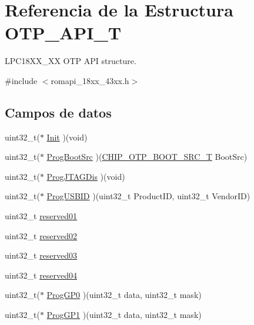 \hypertarget{struct_o_t_p___a_p_i___t}{}\section{Referencia de la Estructura O\+T\+P\+\_\+\+A\+P\+I\+\_\+T}
\label{struct_o_t_p___a_p_i___t}


L\+P\+C18\+X\+X\+\_\+XX O\+TP A\+PI structure.  




{\ttfamily \#include $<$romapi\+\_\+18xx\+\_\+43xx.\+h$>$}

\subsection*{Campos de datos}
\begin{DoxyCompactItemize}
\item 
uint32\+\_\+t($\ast$ \hyperlink{struct_o_t_p___a_p_i___t_a8a4babfa1f2262f27ab56052d32844a9}{Init} )(void)
\item 
uint32\+\_\+t($\ast$ \hyperlink{struct_o_t_p___a_p_i___t_a5d8400d1ec09241959b5e048826c4ae8}{Prog\+Boot\+Src} )(\hyperlink{group___o_t_p__18_x_x__43_x_x_gada36d39d34c8821f0416a852faa926f6}{C\+H\+I\+P\+\_\+\+O\+T\+P\+\_\+\+B\+O\+O\+T\+\_\+\+S\+R\+C\+\_\+T} Boot\+Src)
\item 
uint32\+\_\+t($\ast$ \hyperlink{struct_o_t_p___a_p_i___t_a7e808cb567f2abb5b1323eaebcfa8285}{Prog\+J\+T\+A\+G\+Dis} )(void)
\item 
uint32\+\_\+t($\ast$ \hyperlink{struct_o_t_p___a_p_i___t_ae9d656828234e101564e718306fe7292}{Prog\+U\+S\+B\+ID} )(uint32\+\_\+t Product\+ID, uint32\+\_\+t Vendor\+ID)
\item 
uint32\+\_\+t \hyperlink{struct_o_t_p___a_p_i___t_a8d5004536bec0ff0e679112ce554af6c}{reserved01}
\item 
uint32\+\_\+t \hyperlink{struct_o_t_p___a_p_i___t_a5092df8b6837fdfef7763c16671c7950}{reserved02}
\item 
uint32\+\_\+t \hyperlink{struct_o_t_p___a_p_i___t_aea1729fb238d8d5d4f33e50303c67d4e}{reserved03}
\item 
uint32\+\_\+t \hyperlink{struct_o_t_p___a_p_i___t_aef772adb3cdb4d8979ba092b71d8ba67}{reserved04}
\item 
uint32\+\_\+t($\ast$ \hyperlink{struct_o_t_p___a_p_i___t_a9e871dbff88dbe9f4a3a3bd71de39d0c}{Prog\+G\+P0} )(uint32\+\_\+t data, uint32\+\_\+t mask)
\item 
uint32\+\_\+t($\ast$ \hyperlink{struct_o_t_p___a_p_i___t_a44974e1eceadf104ae5d8c02a2b0864c}{Prog\+G\+P1} )(uint32\+\_\+t data, uint32\+\_\+t mask)

\end{DoxyCompactItemize}
